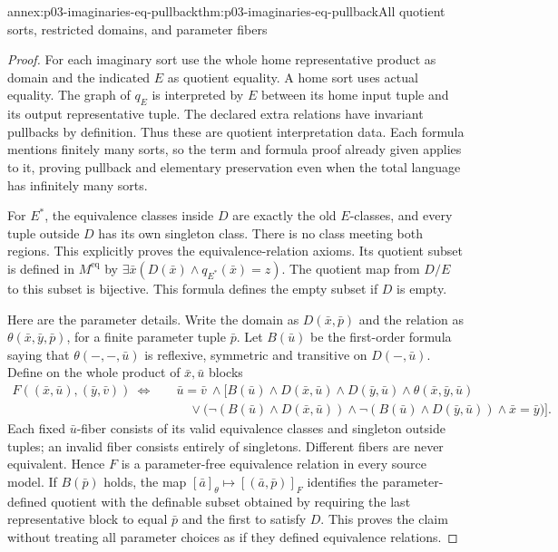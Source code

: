 \begin{annexitem}{annex:p03-imaginaries-eq-pullback}{thm:p03-imaginaries-eq-pullback}{All quotient sorts, restricted domains, and parameter fibers}
\begin{proof}
For each imaginary sort use the whole home representative product as domain
and the indicated \(E\) as quotient equality. A home sort uses actual
equality. The graph of \(q_E\) is interpreted by \(E\) between its
home input tuple and its output representative tuple. The declared extra
relations have invariant pullbacks by definition. Thus these are quotient
interpretation data. Each formula mentions finitely many sorts, so the term
and formula proof already given applies to it, proving pullback and elementary
preservation even when the total language has infinitely many sorts.

For \(E^*\), the equivalence classes inside \(D\) are exactly the
old \(E\)-classes, and every tuple outside \(D\) has its own singleton
class. There is no class meeting both regions. This explicitly proves the
equivalence-relation axioms. Its quotient subset is defined in
\(M^{\mathrm{eq}}\) by
\(\exists\bar x(D(\bar x)\land q_{E^*}(\bar x)=z)\).
The quotient map from \(D/E\) to this subset is bijective. This formula
defines the empty subset if \(D\) is empty.

Here are the parameter details. Write the domain as \(D(\bar x,\bar p)\)
and the relation as \(\theta(\bar x,\bar y,\bar p)\), for a finite
parameter tuple \(\bar p\). Let \(B(\bar u)\) be the first-order
formula saying that \(\theta(-,-,\bar u)\) is reflexive, symmetric
and transitive on \(D(-,\bar u)\). Define on the whole product of
\(\bar x,\bar u\) blocks
\[
\begin{split}
 F((\bar x,\bar u),(\bar y,\bar v))\ \Longleftrightarrow\quad
 &\bar u=\bar v\ \land\bigl[
 B(\bar u)\land D(\bar x,\bar u)\land D(\bar y,\bar u)
                  \land\theta(\bar x,\bar y,\bar u)\\
 &\quad\lor\bigl(\neg(B(\bar u)\land D(\bar x,\bar u))
       \land\neg(B(\bar u)\land D(\bar y,\bar u))
       \land\bar x=\bar y\bigr)\bigr].
\end{split}
\]
Each fixed \(\bar u\)-fiber consists of its valid equivalence classes
and singleton outside tuples; an invalid fiber consists entirely of
singletons. Different fibers are never equivalent. Hence \(F\) is a
parameter-free equivalence relation in every source model. If \(B(\bar p)\)
holds, the map \([\bar a]_\theta\mapsto[(\bar a,\bar p)]_F\)
identifies the parameter-defined quotient with the definable subset obtained
by requiring the last representative block to equal \(\bar p\) and
the first to satisfy \(D\). This proves the claim without treating all
parameter choices as if they defined equivalence relations.


\end{proof}
\end{annexitem}
